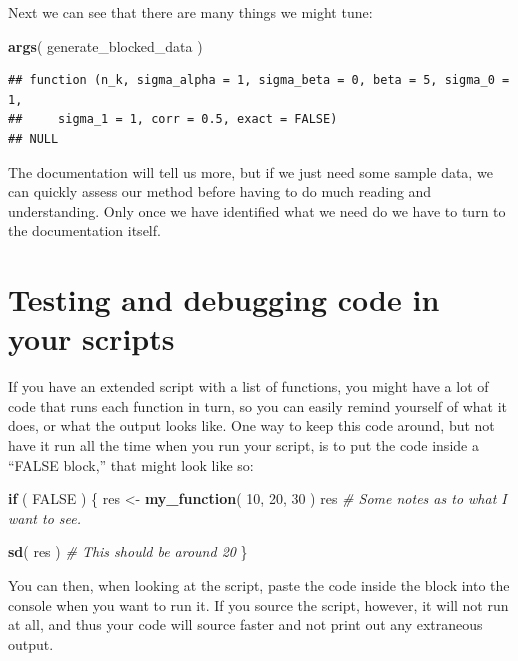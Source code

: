 \documentclass[
]{book}
\newenvironment{Shaded}{\begin{snugshade}}{\end{snugshade}}
\newcommand{\CommentTok}[1]{\textcolor[rgb]{0.56,0.35,0.01}{\textit{#1}}}
\newcommand{\ConstantTok}[1]{\textcolor[rgb]{0.56,0.35,0.01}{#1}}
\newcommand{\ControlFlowTok}[1]{\textcolor[rgb]{0.13,0.29,0.53}{\textbf{#1}}}
\newcommand{\DecValTok}[1]{\textcolor[rgb]{0.00,0.00,0.81}{#1}}
\newcommand{\FunctionTok}[1]{\textcolor[rgb]{0.13,0.29,0.53}{\textbf{#1}}}
\newcommand{\NormalTok}[1]{#1}
\newcommand{\OtherTok}[1]{\textcolor[rgb]{0.56,0.35,0.01}{#1}}
\begin{document}
Next we can see that there are many things we might tune:

\begin{Shaded}
\begin{Highlighting}[]
\FunctionTok{args}\NormalTok{( generate\_blocked\_data )}
\end{Highlighting}
\end{Shaded}

\begin{verbatim}
## function (n_k, sigma_alpha = 1, sigma_beta = 0, beta = 5, sigma_0 = 1, 
##     sigma_1 = 1, corr = 0.5, exact = FALSE) 
## NULL
\end{verbatim}

The documentation will tell us more, but if we just need some sample data, we can quickly assess our method before having to do much reading and understanding.
Only once we have identified what we need do we have to turn to the documentation itself.

\section{Testing and debugging code in your scripts}\label{testing-and-debugging-code-in-your-scripts}

If you have an extended script with a list of functions, you might have a lot of code that runs each function in turn, so you can easily remind yourself of what it does, or what the output looks like.
One way to keep this code around, but not have it run all the time when you run your script, is to put the code inside a ``FALSE block,'' that might look like so:

\begin{Shaded}
\begin{Highlighting}[]
\ControlFlowTok{if}\NormalTok{ ( }\ConstantTok{FALSE}\NormalTok{ ) \{}
\NormalTok{  res }\OtherTok{\textless{}{-}} \FunctionTok{my\_function}\NormalTok{( }\DecValTok{10}\NormalTok{, }\DecValTok{20}\NormalTok{, }\DecValTok{30}\NormalTok{ )}
\NormalTok{  res}
  \CommentTok{\# Some notes as to what I want to see.}
  
  \FunctionTok{sd}\NormalTok{( res )}
  \CommentTok{\# This should be around 20}
\NormalTok{\}}
\end{Highlighting}
\end{Shaded}

You can then, when looking at the script, paste the code inside the block into the console when you want to run it.
If you source the script, however, it will not run at all, and thus your code will source faster and not print out any extraneous output.
\end{document}

